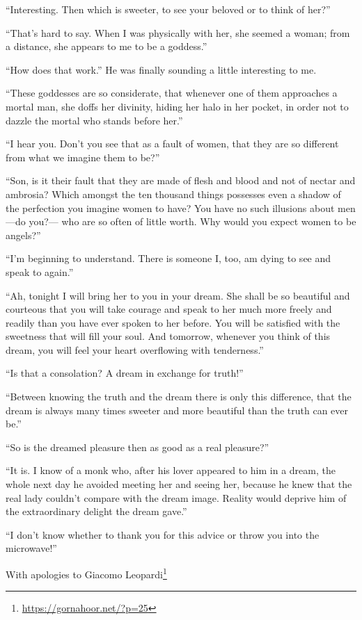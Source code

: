 ``Interesting. Then which is sweeter, to see your beloved or to think of her?''

``That's hard to say. When I was physically with her, she seemed a woman; from a distance, she appears to me to be a goddess.''

``How does that work.'' He was finally sounding a little interesting to me.

``These goddesses are so considerate, that whenever one of them approaches a mortal man, she doffs her divinity, hiding her halo in her pocket, in order not to dazzle the mortal who stands before her.''

``I hear you. Don't you see that as a fault of women, that they are so different from what we imagine them to be?''

``Son, is it their fault that they are made of flesh and blood and not of nectar and ambrosia? Which amongst the ten thousand things possesses even a shadow of the perfection you imagine women to have? You have no such illusions about men---do you?--- who are so often of little worth. Why would you expect women to be angels?''

``I'm beginning to understand. There is someone I, too, am dying to see and speak to again.''

``Ah, tonight I will bring her to you in your dream. She shall be so beautiful and courteous that you will take courage and speak to her much more freely and readily than you have ever spoken to her before. You will be satisfied with the sweetness that will fill your soul. And tomorrow, whenever you think of this dream, you will feel your heart overflowing with tenderness.''

``Is that a consolation? A dream in exchange for truth!''

``Between knowing the truth and the dream there is only this difference, that the dream is always many times sweeter and more beautiful than the truth can ever be.''

``So is the dreamed pleasure then as good as a real pleasure?''

``It is. I know of a monk who, after his lover appeared to him in a dream, the whole next day he avoided meeting her and seeing her, because he knew that the real lady couldn't compare with the dream image. Reality would deprive him of the extraordinary delight the dream gave.''

``I don't know whether to thank you for this advice or throw you into the microwave!''

With apologies to Giacomo Leopardi\footnote{\url{https://gornahoor.net/?p=25}}


